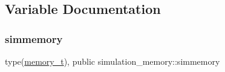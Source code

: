 \subsection{Variable Documentation}
\mbox{\label{namespacesimulation__memory_a8ed2bc20b0c49405084442d02fc76d42}} 
\subsubsection{\texorpdfstring{simmemory}{simmemory}}
{\footnotesize\ttfamily type(\mbox{\hyperlink{structsimulation__memory_1_1memory__t}{memory\+\_\+t}}), public simulation\+\_\+memory\+::simmemory}

